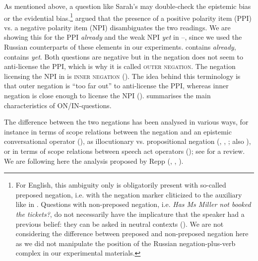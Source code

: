 \documentclass[output=paper,colorlinks,citecolor=brown]{langscibook}
\begin{document}
\noindent As mentioned above, a question like Sarah’s may double-check the epistemic bias or the evidential bias.{\footnote{For English, this ambiguity only is obligatorily present with so-called preposed negation, i.e. with the negation marker cliticized to the auxiliary like in . Questions with non-preposed negation, i.e. \textit{Has Ms Miller not booked the tickets?}, do not necessarily have the implicature that the speaker had a previous belief: they can be asked in neutral contexts (\citealt{RomeroHan2004}). We are not considering the difference between preposed and non-preposed negation here as we did not manipulate the position of the Russian negation-plus-verb complex in our experimental materials.}} \citet{Ladd1981} argued that the presence of a positive polarity item (PPI) vs. a negative polarity item (NPI) disambiguates the two readings. We are showing this for the PPI \textit{already} and the weak NPI \textit{yet} in --, since we used the Russian counterparts of these elements in our experiments.  contains \textit{already},  contains \textit{yet}. Both questions are negative but in  the negation does not seem to anti-license the PPI, which is why it is called \textsc{outer negation}. The negation licensing the NPI in  is \textsc{inner negation} (\citealt{RomeroHan2004}). The idea behind this terminology is that outer negation is ``too far out'' to anti-license the PPI, whereas inner negation is close enough to license the NPI (\citealt{Ladd1981}).  summarises the main characteristics of ON/IN-questions.\largerpage

\ea\label{geist-repp:ex:miller}
\z
\z

\noindent The difference between the two negations has been analysed in various ways, for instance in terms of scope relations between the negation and an epistemic conversational operator (\citealt{RomeroHan2004}), as illocutionary vs. propositional negation (\citealt{Repp2006}, \citeyear{Repp2009}, \citeyear{Repp2013}; also \citealt{Romero2015}), or in terms of scope relations between speech act operators (\citealt{Krifka2015}); see \citet{Romero2020} for a review. We are following here the analysis proposed by Repp (\citeyear{Repp2006}, \citeyear{Repp2009}, \citeyear{Repp2013}). 
\end{document}

